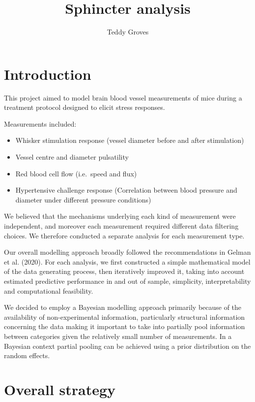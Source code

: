 \documentclass[
  letterpaper,
  DIV=11,
  numbers=noendperiod,
  oneside]{scrartcl}
\title{Sphincter analysis}
\author{Teddy Groves}
\date{}
\providecommand{\tightlist}{%
  \setlength{\itemsep}{0pt}\setlength{\parskip}{0pt}}\usepackage{longtable,booktabs,array}
\renewcommand*\contentsname{Table of contents}
\newcommand\contentsname{Table of contents}
\theoremstyle{plain}
\theoremstyle{remark}
\begin{document}
\maketitle

\renewcommand*\contentsname{Table of contents}
{
\hypersetup{linkcolor=}
\setcounter{tocdepth}{3}
\tableofcontents
}
\section{Introduction}\label{introduction}

This project aimed to model brain blood vessel measurements of mice
during a treatment protocol designed to elicit stress responses.

Measurements included:

\begin{itemize}
\tightlist
\item
  Whisker stimulation response (vessel diameter before and after
  stimulation)
\item
  Vessel centre and diameter pulsatility
\item
  Red blood cell flow (i.e.~speed and flux)
\item
  Hypertensive challenge response (Correlation between blood pressure
  and diameter under different pressure conditions)
\end{itemize}

We believed that the mechanisms underlying each kind of measurement were
independent, and moreover each measurement required different data
filtering choices. We therefore conducted a separate analysis for each
measurement type.

Our overall modelling approach broadly followed the recommendations in
Gelman et al. (2020). For each analysis, we first constructed a simple
mathematical model of the data generating process, then iteratively
improved it, taking into account estimated predictive performance in and
out of sample, simplicity, interpretability and computational
feasibility.

We decided to employ a Bayesian modelling approach primarily because of
the availability of non-experimental information, particularly
structural information concerning the data making it important to take
into partially pool information between categories given the relatively
small number of measurements. In a Bayesian context partial pooling can
be achieved using a prior distribution on the random effects.

\section{Overall strategy}\label{overall-strategy}
\end{document}
